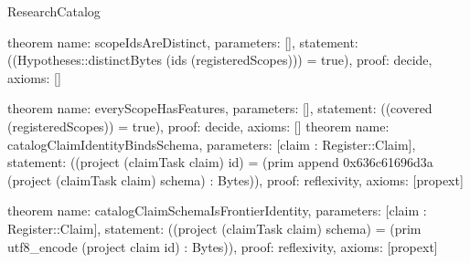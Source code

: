 \begin{lexlean}{ResearchCatalog}
\begin{semanticmodule}
theorem{
  name: scopeIdsAreDistinct,
  parameters: [],
  statement: ((Hypotheses::distinctBytes (ids (registeredScopes))) = true),
  proof: decide{},
  axioms: []
}

theorem{
  name: everyScopeHasFeatures,
  parameters: [],
  statement: ((covered (registeredScopes)) = true),
  proof: decide{},
  axioms: []
}
theorem{
  name: catalogClaimIdentityBindsSchema,
  parameters: [claim : Register::Claim],
  statement: ((project (claimTask claim) id) = (prim append 0x636c61696d3a (project (claimTask claim) schema) : Bytes)),
  proof: reflexivity{},
  axioms: [propext]
}

theorem{
  name: catalogClaimSchemaIsFrontierIdentity,
  parameters: [claim : Register::Claim],
  statement: ((project (claimTask claim) schema) = (prim utf8_encode (project claim id) : Bytes)),
  proof: reflexivity{},
  axioms: [propext]
}
\end{semanticmodule}
\end{lexlean}
